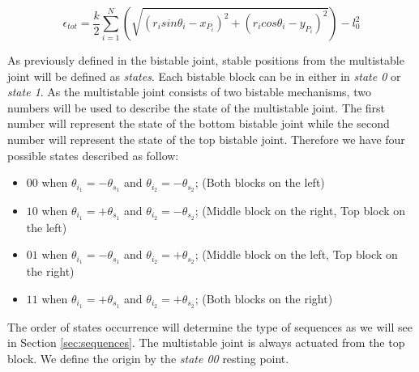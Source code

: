         \begin{equation}
            \epsilon_{tot} = \frac{k}{2} \sum_{i=1}^{N}\left(\sqrt{(r_i sin \theta_i - x_{P_i})^2 + (r_i cos \theta_i - y_{P_i})^2} \right) - l_0^2
            \label{eq:potential}
        \end{equation}
        
        As previously defined in the bistable joint, stable positions from the multistable joint will be defined as \textit{states}. Each bistable block can be in either in \textit{state 0} or \textit{state 1}. As the multistable joint consists of two bistable mechanisms, two numbers will be used to describe the state of the multistable joint. The first number will represent the state of the bottom bistable joint while the second number will represent the state of the top bistable joint. Therefore we have four possible states described as follow:\\
        \begin{itemize}
            \item $00$ when $\theta_{i_1} = -\theta_{s_1}$ and $\theta_{i_2} = -\theta_{s_2}$; (Both blocks on the left)
            \item $10$ when $\theta_{i_1} = +\theta_{s_1}$ and $\theta_{i_2} = -\theta_{s_2}$; (Middle block on the right, Top block on the left)
            \item $01$ when $\theta_{i_1} = -\theta_{s_1}$ and $\theta_{i_2} = +\theta_{s_2}$; (Middle block on the left, Top block on the right)
            \item $11$ when $\theta_{i_1} = +\theta_{s_1}$ and $\theta_{i_2} = +\theta_{s_2}$; (Both blocks on the right)
        \end{itemize}
        
        The order of states occurrence will determine the type of sequences as we will see in Section \ref{sec:sequences}. The multistable joint is always actuated from the top block. We define the origin by the \textit{state 00} resting point.
        
